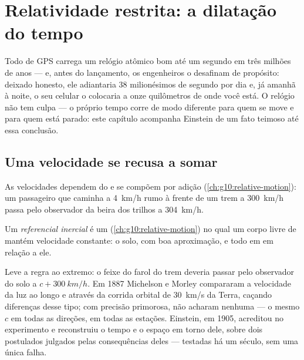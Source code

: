 \chapter{Relatividade restrita: a dilatação do tempo}\label{ch:g12:special-relativity}

Todo  de GPS carrega um relógio atômico bom até um segundo em três milhões de
anos --- e, antes do lançamento, os engenheiros o desafinam de propósito: deixado
honesto, ele adiantaria 38 milionésimos de segundo por dia e, já amanhã à noite, o seu
celular o colocaria a onze quilômetros de onde você está. O relógio não tem culpa --- o
próprio tempo corre de modo diferente para quem se move e para quem está parado: este
capítulo acompanha Einstein de um fato teimoso até essa conclusão.

\section{Uma velocidade se recusa a somar}

As velocidades dependem do  e se compõem por adição
(\cref{ch:g10:relative-motion}): um passageiro que caminha a \qty{4}{km/h} rumo à frente
de um trem a \qty{300}{km/h} passa pelo observador da beira dos trilhos a
\qty{304}{km/h}.

\begin{definition}\label{def:g12:special-relativity:inertial}
Um \emph{referencial inercial} é um 
(\cref{ch:g10:relative-motion}) no qual um corpo livre de  mantém velocidade
constante: o solo, com boa aproximação, e todo  em  em relação a ele.
\end{definition}

Leve a regra ao extremo: o feixe do farol do trem deveria passar pelo observador do solo
a $c + \qty{300}{km/h}$. Em 1887 Michelson e Morley compararam a velocidade da luz ao
longo e através da corrida orbital de \qty{30}{km/s} da Terra, caçando diferenças desse
tipo; com precisão primorosa, não acharam nenhuma --- o mesmo $c$ em todas as direções,
em todas as estações. Einstein, em 1905, acreditou no experimento e reconstruiu o tempo e
o espaço em torno dele, sobre dois postulados julgados pelas consequências deles ---
testadas há um século, sem uma única falha.

